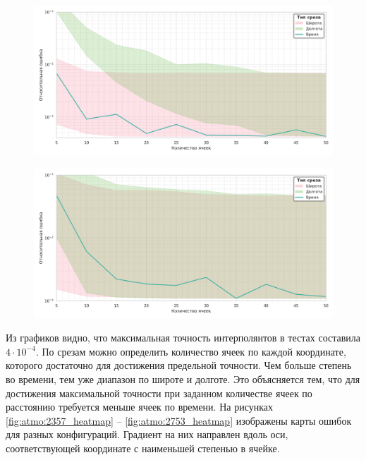  \begin{figure}[h!]
    \centering
    \includegraphics[width=\linewidth]{../images/solution/atmo/2735.png}
    \label{fig:atmo:2735}
 \end{figure}

 \begin{figure}[h!]
    \centering
    \includegraphics[width=\linewidth]{../images/solution/atmo/2753.png}
    \label{fig:atmo:2753}
 \end{figure}

 Из графиков видно, что максимальная точность интерполянтов в тестах составила $4 \cdot 10^{-4}$.
 По срезам можно определить количество ячеек по каждой координате, которого достаточно для достижения
 предельной точности. Чем больше степень во времени, тем уже диапазон по широте и долготе. Это объясняется тем,
 что для достижения максимальной точности при заданном количестве ячеек по расстоянию
 требуется меньше ячеек по времени. На рисунках \ref{fig:atmo:2357_heatmap} -- \ref{fig:atmo:2753_heatmap} изображены карты
 ошибок для разных конфигураций. Градиент на них направлен вдоль оси, соответствующей
 координате с наименьшей степенью в ячейке.

